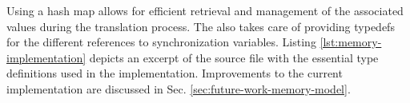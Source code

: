Using a hash map allows for efficient retrieval
and management of the associated values during the translation process.
The  also takes care of providing typedefs for the different
references to synchronization variables.
Listing \ref{lst:memory-implementation} depicts an excerpt of the source file
with the essential type definitions used in the implementation.
Improvements to the current implementation are discussed in Sec. \ref{sec:future-work-memory-model}.